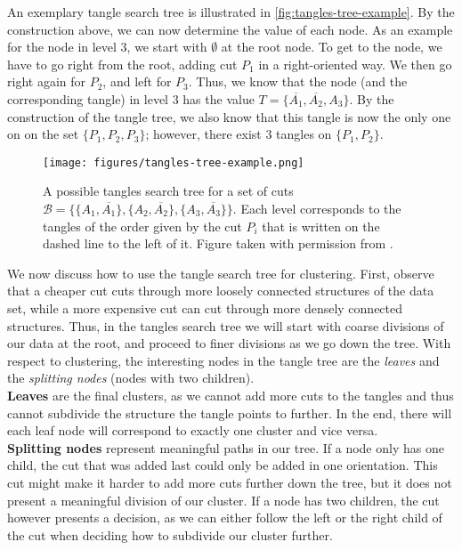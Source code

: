 An exemplary tangle search tree is illustrated in \autoref{fig:tangles-tree-example}. 
By the construction above, we can now determine the value of each node. 
As an example for the node in level 3, we start with $\emptyset$ at the root node. To
get to the node, we have to go right from the root, adding cut $P_1$ in a right-oriented
way. We then go right again for $P_2$, and left for $P_3$. Thus, we know that the node (and the 
corresponding tangle) in level 3 has the value $T = \{\overline{A_1}, \overline{A_2}, A_3\}$. 
By the construction of the tangle tree, we also know that this tangle is now the only one on
on the set $\{P_1, P_2, P_3\}$; however, there exist 3 tangles on $\{P_1, P_2\}$.


\begin{figure}[h]
    \centering
    \texttt{[image: figures/tangles-tree-example.png]}
    \caption{A possible tangles search tree for a set of cuts $\mathcal{B} = \{\{A_1, \overline{A_1}\}, \{A_2, \overline{A_2}\}, \{A_3, \overline{A_3}\} \}$. 
        Each level corresponds to the tangles of the order given by the cut $P_i$ that is written on the dashed line to the left of it.
        Figure taken with permission from \cite{klepperClusteringTanglesAlgorithmic2021}.}
    \label{fig:tangles-tree-example}
\end{figure}

We now discuss how to use the tangle search tree for clustering. 
First, observe that a cheaper cut cuts through more loosely connected structures
of the data set, while a more expensive cut can cut through more densely connected structures.
Thus, in the tangles search tree we will start with coarse divisions of our data
at the root, and proceed to finer divisions as we go down the tree. With respect to clustering, the interesting nodes in the tangle tree are the \textit{leaves} and
the \textit{splitting nodes} (nodes with two children). \\
\textbf{Leaves} are the final clusters, as we cannot add more cuts to the tangles and thus cannot subdivide the structure the tangle points to further. In the end, 
there will each leaf node will correspond to exactly one cluster and vice versa.\\
\textbf{Splitting nodes} represent meaningful paths in our tree. If a node only has one child,
the cut that was added last could only be added in one orientation. This cut might make it harder to add more cuts further down the tree, but it does not present
a meaningful division of our cluster. If a node has two children, 
the cut however presents a decision, as we can either follow the left or the right
child of the cut when deciding how to subdivide our cluster further. 

